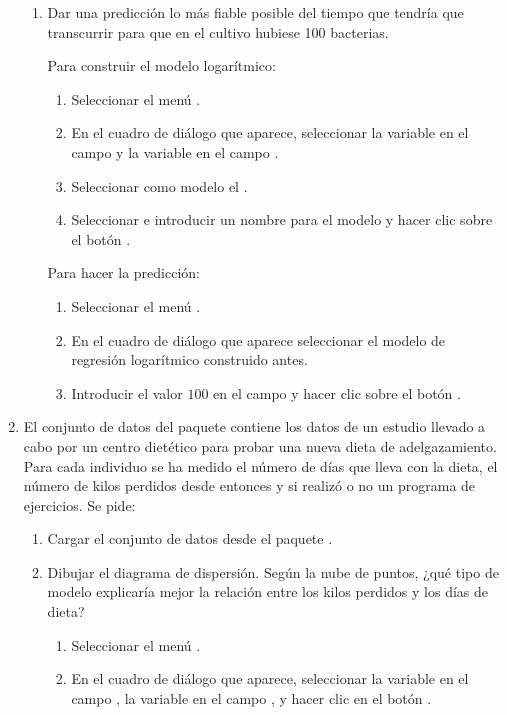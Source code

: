 \begin{enumerate}[leftmargin=*]
\begin{enumerate}
\item Dar una predicción lo más fiable posible del tiempo que tendría que transcurrir para que en el cultivo hubiese 100
bacterias.
\begin{indicacion}
Para construir el modelo logarítmico:
\begin{enumerate}
\item Seleccionar el menú .
\item En el cuadro de diálogo que aparece, seleccionar la variable  en el campo  y la variable  en el campo .
\item Seleccionar como modelo el .
\item Seleccionar  e introducir un nombre para el modelo y hacer clic sobre el botón .
\end{enumerate}
Para hacer la predicción:
\begin{enumerate}
\item Seleccionar el menú .
\item En el cuadro de diálogo que aparece seleccionar el modelo de regresión logarítmico construido antes.
\item Introducir el valor $100$ en el campo  y hacer clic sobre el botón .
\end{enumerate}
\end{indicacion}
\end{enumerate}

\item El conjunto de datos  del paquete  contiene los datos de un estudio llevado
a cabo por un centro dietético para probar una nueva dieta de adelgazamiento.
Para cada individuo se ha medido el número de días que lleva con la dieta, el número de kilos perdidos desde entonces y
si realizó o no un programa de ejercicios.
Se pide:
\begin{enumerate}
\item Cargar el conjunto de datos  desde el paquete .

\item Dibujar el diagrama de dispersión. 
Según la nube de puntos, ¿qué tipo de modelo explicaría mejor la relación entre los kilos perdidos y los días de dieta?
\begin{indicacion}
\begin{enumerate}
\item Seleccionar el menú .
\item En el cuadro de diálogo que aparece, seleccionar la variable  en el campo , la
variable  en el campo , y hacer clic en el botón .
\end{enumerate}
\end{indicacion}


\end{enumerate}
\end{enumerate}
